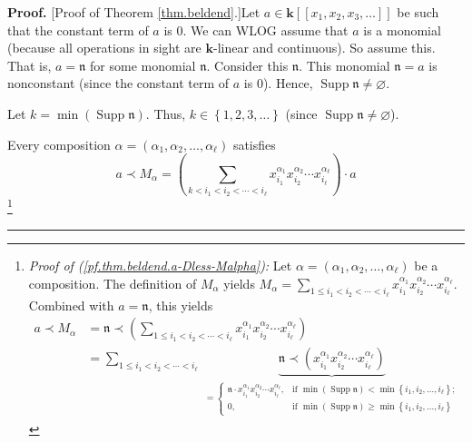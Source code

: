 \documentclass
[numbers=enddot,12pt,final,onecolumn,notitlepage,abstracton]{scrartcl}%
\theoremstyle{definition}
\newenvironment{proof}[1][Proof]{\noindent\textbf{#1.} }{\ \rule{0.5em}{0.5em}}
\newenvironment{verlong}{}{}
\let\sumnonlimits\sum
\renewcommand{\sum}{\sumnonlimits\limits}
\begin{document}
\begin{proof}
[Proof of Theorem \ref{thm.beldend}.]Let $a\in\mathbf{k}\left[  \left[
x_{1},x_{2},x_{3},\ldots\right]  \right]  $ be such that the constant term of
$a$ is $0$. We can WLOG assume that $a$ is a monomial (because all operations
in sight are $\mathbf{k}$-linear and continuous). So assume this. That is,
$a=\mathfrak{n}$ for some monomial $\mathfrak{n}$. Consider this
$\mathfrak{n}$. This monomial $\mathfrak{n}=a$ is nonconstant (since the
constant term of $a$ is $0$). Hence, $\operatorname*{Supp}\mathfrak{n}%
\neq\varnothing$.

Let $k=\min\left(  \operatorname*{Supp}\mathfrak{n}\right)  $. Thus,
$k\in\left\{  1,2,3,\ldots\right\}  $ (since $\operatorname*{Supp}%
\mathfrak{n}\neq\varnothing$).

\begin{verlong}
Every composition $\alpha=\left(  \alpha_{1},\alpha_{2},\ldots,\alpha_{\ell
}\right)  $ satisfies%
\begin{equation}
a\left.  \prec\right.  M_{\alpha}=\left(  \sum_{k<i_{1}<i_{2}<\cdots<i_{\ell}%
}x_{i_{1}}^{\alpha_{1}}x_{i_{2}}^{\alpha_{2}}\cdots x_{i_{\ell}}^{\alpha
_{\ell}}\right)  \cdot a \label{pf.thm.beldend.a-Dless-Malpha}%
\end{equation}
\footnote{\textit{Proof of (\ref{pf.thm.beldend.a-Dless-Malpha}):} Let
$\alpha=\left(  \alpha_{1},\alpha_{2},\ldots,\alpha_{\ell}\right)  $ be a
composition. The definition of $M_{\alpha}$ yields $M_{\alpha}=\sum_{1\leq
i_{1}<i_{2}<\cdots<i_{\ell}}x_{i_{1}}^{\alpha_{1}}x_{i_{2}}^{\alpha_{2}}\cdots
x_{i_{\ell}}^{\alpha_{\ell}}$. Combined with $a=\mathfrak{n}$, this yields%
\begin{align*}
a\left.  \prec\right.  M_{\alpha}  &  =\mathfrak{n}\left.  \prec\right.
\left(  \sum_{1\leq i_{1}<i_{2}<\cdots<i_{\ell}}x_{i_{1}}^{\alpha_{1}}%
x_{i_{2}}^{\alpha_{2}}\cdots x_{i_{\ell}}^{\alpha_{\ell}}\right) \\
&  =\sum_{1\leq i_{1}<i_{2}<\cdots<i_{\ell}}\underbrace{\mathfrak{n}\left.
\prec\right.  \left(  x_{i_{1}}^{\alpha_{1}}x_{i_{2}}^{\alpha_{2}}\cdots
x_{i_{\ell}}^{\alpha_{\ell}}\right)  }_{\substack{=%
\begin{cases}
\mathfrak{n}\cdot x_{i_{1}}^{\alpha_{1}}x_{i_{2}}^{\alpha_{2}}\cdots
x_{i_{\ell}}^{\alpha_{\ell}}, & \text{if }\min\left(  \operatorname*{Supp}%
\mathfrak{n}\right)  <\min\left\{  i_{1},i_{2},\ldots,i_{\ell}\right\}  ;\\
0, & \text{if }\min\left(  \operatorname*{Supp}\mathfrak{n}\right)  \geq
\min\left\{  i_{1},i_{2},\ldots,i_{\ell}\right\}

\end{cases}}}
\end{align*}}
\end{verlong}
\end{proof}
\end{document}
